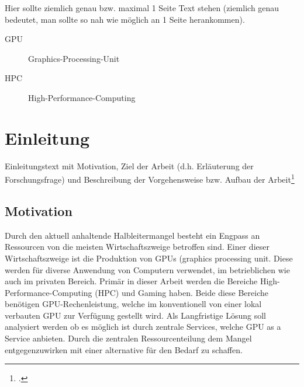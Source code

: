 \documentclass[12pt,toc=bib,toc=listof]{scrreprt}
\title{\topic}
\author{\studentnameA { ({\studentidA)}}, \\ \studentnameB { ({\studentidB)}}, \\ \studentnameC { ({\studentidC)}} }
\date {\semester}
\newcounter{savepage}
\begin{document}
\sffamily
\maketitle

\label{sec:management_summary}

Hier sollte ziemlich genau bzw. maximal 1 Seite Text stehen (ziemlich genau  bedeutet, man sollte so nah wie möglich an 1 Seite herankommen).


\tableofcontents

\label{sec:abkuerzungsverzeichnis}

\begin{description}
\item[GPU] Graphics-Processing-Unit
\item[HPC] High-Performance-Computing
\end{description}


\listoffigures
\listoftables


\newpage

\chapter{Einleitung} %
\label{sec:einleitung}

Einleitungstext mit Motivation, Ziel der Arbeit (d.h. Erläuterung der Forschungsfrage) und Beschreibung der Vorgehensweise bzw. Aufbau der Arbeit\footcite [vgl.] [S. 38]{Th17}

\section{Motivation} %
\label{sec:motivation}

Durch den aktuell anhaltende Halbleitermangel besteht ein Engpass an Ressourcen von die meisten Wirtschaftszweige betroffen sind.
Einer dieser Wirtschaftszweige ist die Produktion von GPUs (graphics processing unit. Diese werden für diverse Anwendung von Computern verwendet, im betrieblichen wie auch im privaten Bereich.
Primär in dieser Arbeit werden die Bereiche High-Performance-Computing (HPC) und Gaming haben.
Beide diese Bereiche benötigen GPU-Rechenleistung, welche im konventionell von einer lokal verbauten GPU zur Verfügung gestellt wird. 
Als Langfristige Lösung soll analysiert werden ob es möglich ist durch zentrale Services, welche GPU as a Service anbieten. 
Durch die zentralen Ressourcenteilung dem Mangel entgegenzuwirken mit einer alternative für den Bedarf zu schaffen.
\end{document}
